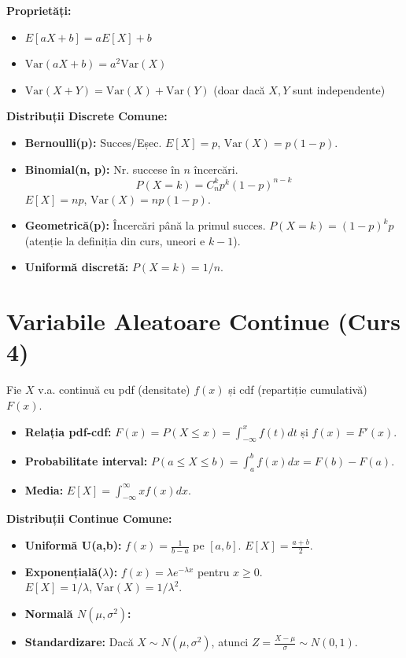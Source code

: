 \documentclass[12pt, a4paper]{article}
\begin{document}
\textbf{Proprietăți:}
\begin{itemize}
    \item $E[aX + b] = aE[X] + b$
    \item $\text{Var}(aX + b) = a^2 \text{Var}(X)$
    \item $\text{Var}(X+Y) = \text{Var}(X) + \text{Var}(Y)$ (doar dacă $X,Y$ sunt independente)
\end{itemize}

\textbf{Distribuții Discrete Comune:}
\begin{itemize}
    \item \textbf{Bernoulli(p):} Succes/Eșec. $E[X]=p$, $\text{Var}(X)=p(1-p)$.
    \item \textbf{Binomial(n, p):} Nr. succese în $n$ încercări. 
    \[ P(X=k) = C_n^k p^k (1-p)^{n-k} \]
    $E[X] = np$, $\text{Var}(X) = np(1-p)$.
    \item \textbf{Geometrică(p):} Încercări până la primul succes. $P(X=k) = (1-p)^k p$ (atenție la definiția din curs, uneori e $k-1$).
    \item \textbf{Uniformă discretă:} $P(X=k) = 1/n$.
\end{itemize}

\hrulefill

\section{Variabile Aleatoare Continue (Curs 4)}
Fie $X$ v.a. continuă cu pdf (densitate) $f(x)$ și cdf (repartiție cumulativă) $F(x)$.

\begin{itemize}
    \item \textbf{Relația pdf-cdf:} $F(x) = P(X \le x) = \int_{-\infty}^x f(t)dt$ și $f(x) = F'(x)$.
    \item \textbf{Probabilitate interval:} $P(a \le X \le b) = \int_a^b f(x)dx = F(b) - F(a)$.
    \item \textbf{Media:} $E[X] = \int_{-\infty}^{\infty} x f(x) dx$.
\end{itemize}

\textbf{Distribuții Continue Comune:}
\begin{itemize}
    \item \textbf{Uniformă U(a,b):} $f(x) = \frac{1}{b-a}$ pe $[a,b]$. $E[X] = \frac{a+b}{2}$.
    \item \textbf{Exponențială($\lambda$):} $f(x) = \lambda e^{-\lambda x}$ pentru $x \ge 0$. \\
    $E[X] = 1/\lambda$, $\text{Var}(X) = 1/\lambda^2$.
    \item \textbf{Normală $N(\mu, \sigma^2)$:}
    \item \textbf{Standardizare:} Dacă $X \sim N(\mu, \sigma^2)$, atunci $Z = \frac{X-\mu}{\sigma} \sim N(0,1)$.
\end{itemize}
\end{document}
